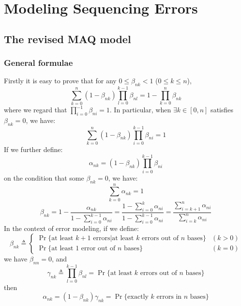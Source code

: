 \documentclass[pdftex,10pt]{book}
\begin{document}
\chapter{Modeling Sequencing Errors}

\section{The revised MAQ model}
\subsection{General formulae}
Firstly it is easy to prove that for any $0\le\beta_{nk}<1$ ($0\le k\le n$),
$$
\sum_{k=0}^n(1-\beta_{nk})\prod_{l=0}^{k-1}\beta_{nl}=1-\prod_{k=0}^n\beta_{nk}
$$
where we regard that $\prod_{i=0}^{-1}\beta_{ni}=1$. In particular, when
$\exists k\in[0,n]$ satisfies $\beta_{nk}=0$, we have:
\[\sum^n_{k=0}(1-\beta_{nk})\prod_{i=0}^{k-1}\beta_{ni}=1\]
If we further define:
\begin{equation}\label{equ:alpha-nk}
  \alpha_{nk}=(1-\beta_{nk})\prod_{i=0}^{k-1}\beta_{ni}
\end{equation}
on the condition that some $\beta_{nk}=0$, we have:
\[\sum_{k=0}^n\alpha_{nk}=1\]
\begin{equation*}
\beta_{nk}=1-\frac{\alpha_{nk}}{1-\sum_{i=0}^{k-1}\alpha_{ni}}
=\frac{1-\sum_{i=0}^k\alpha_{ni}}{1-\sum_{i=0}^{k-1}\alpha_{ni}}
=\frac{\sum_{i=k+1}^n\alpha_{ni}}{\sum_{i=k}^n\alpha_{ni}}
\end{equation*}
In the context of error modeling, if we define:
\[
\beta_{nk}\triangleq\left\{\begin{array}{ll}
    \Pr\{\mbox{at least $k+1$ errors}|\mbox{at least $k$ errors out of $n$ bases}\} & (k>0) \\
    \Pr\{\mbox{at least $1$ error out of $n$ bases}\} & (k=0)
  \end{array}\right.
\]
we have $\beta_{nn}=0$, and
$$
\gamma_{nk}\triangleq\prod_{l=0}^{k-1}\beta_{nl}=\Pr\{\mbox{at least $k$ errors out of $n$ bases}\}
$$
then
$$
\alpha_{nk}=(1-\beta_{nk})\gamma_{nk}=\Pr\{\mbox{exactly $k$ errors in $n$ bases}\}
$$
\end{document}
